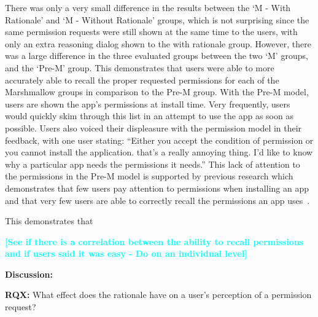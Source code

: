 \documentclass{sig-alternate-05-2015}
\newcommand{\todo}[1]{\textcolor{cyan}{\textbf{[#1]}}}
\begin{document}
There was only a very small difference in the results between the `M - With Rationale' and `M - Without Rationale' groups, which is not surprising since the same permission requests were still shown at the same time to the users, with only an extra reasoning dialog shown to the with rationale group. However, there was a large difference in the three evaluated groups between the two `M' groups, and the `Pre-M' group. This demonstrates that users were able to more accurately able to recall the proper requested permissions for each of the Marshmallow groups in comparison to the Pre-M group. With the Pre-M model, users are shown the app's permissions at install time. Very frequently, users would quickly skim through this list in an attempt to use the app as soon as possible. Users also voiced their displeasure with the permission model in their feedback, with one user stating: ``Either you accept the condition of permission or you cannot install the application. that's a really annoying thing. I'd like to know why a particular app needs the permissions it needs.'' This lack of attention to the permissions in the Pre-M model is supported by previous research which demonstrates that few users pay attention to permissions when installing an app and that very few users are able to correctly recall the permissions an app uses~\cite{Felt:2012:APU:2335356.2335360}.




This demonstrates that %







\todo{See if there is a correlation between the ability to recall permissions and if users said it was easy - Do on an individual level}


\textbf{Discussion:}





\textbf{RQX:} What effect does the rationale have on a user's perception of a permission request?
\end{document}
